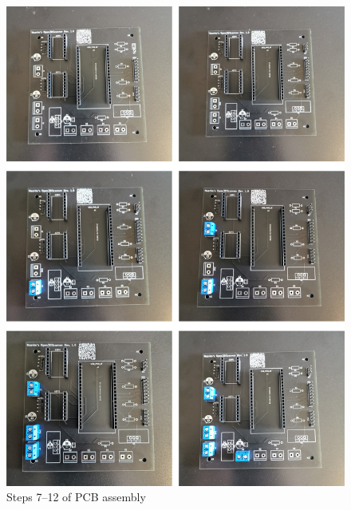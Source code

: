 \begin{figure}[ht!]%
	\begin{centered}%
		\includegraphics[width=\linewidth]{images/PcbSeries2.jpg}%
		\caption{Steps \numrange[text-rm=\lightBoldFont]{7}{12} of PCB assembly}%
	\end{centered}%
\end{figure}%

